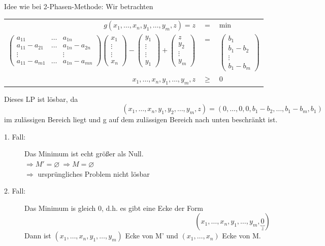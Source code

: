 \documentclass[a4paper,11pt,twoside,titlepage]{article}
\begin{document}
Idee wie bei 2-Phasen-Methode: Wir betrachten
\begin{center}
\begin{tabular}{|rcl|}\hline
$g(x_1,\ldots,x_n,y_1,\ldots,y_m,z)=z$&=&min\\
$\left(\begin{array}{ccc}
a_{11}&\ldots&a_{1n}\\
a_{11}-a_{21}&\ldots&a_{1n}-a_{2n}\\
\vdots&&\vdots\\
a_{11}-a_{m1}&\ldots&a_{1n}-a_{mn}
\end{array}\right)\begin{pmatrix}x_1\\\vdots\\\vdots\\x_n\end{pmatrix}-\begin{pmatrix}y_1\\\vdots\\\vdots\\y_1\end{pmatrix}+\begin{pmatrix}z\\y_2\\\vdots\\y_m\end{pmatrix}$&=&$\begin{pmatrix}b_1\\b_1-b_2\\\vdots\\b_1-b_m\end{pmatrix}$\\
$x_1,\ldots,x_n,y_1,\ldots,y_m,z$&$\geq$&0\\\hline
\end{tabular}
\end{center}
Dieses LP ist lösbar, da
\[(x_1,\ldots,x_n,y_1,y_2,\ldots,y_m,z)=(0,\ldots,0,0,b_1-b_2,\ldots,b_1-b_m,b_1)\]
im zulässigen Bereich liegt und g auf dem zulässigen Bereich nach unten beschränkt ist.

\begin{description}
\item[1. Fall:] Das Minimum ist echt größer als Null.\\
$\Rightarrow M'=\varnothing\ \Rightarrow M=\varnothing$\\
$\Rightarrow$ ursprüngliches Problem nicht lösbar
\item[2. Fall:] Das Minimum is gleich 0, d.h. es gibt eine Ecke der Form $$(x_1,\ldots,x_n,y_1,\ldots,y_m,\underbrace{0}_{z})$$
Dann ist $(x_1,\ldots,x_n,y_1,\ldots,y_m)$ Ecke von M' und $(x_1,\ldots,x_n)$ Ecke von M.
\end{description}
\end{document}
